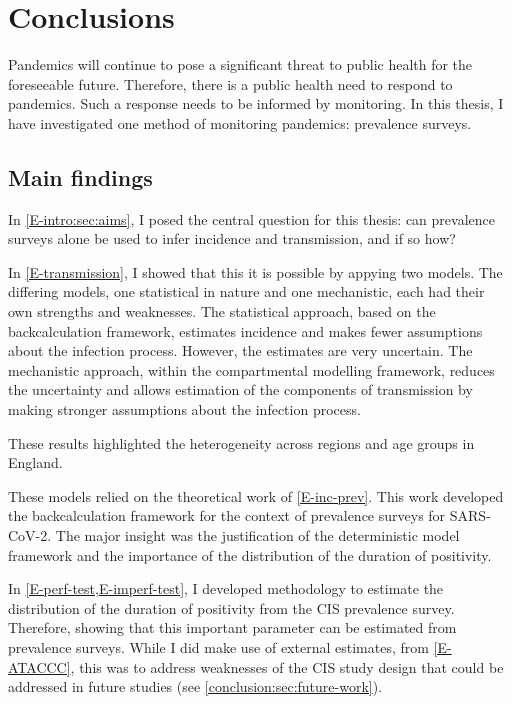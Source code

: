 \documentclass[thesis.tex]{subfiles}
\begin{document}
\ifSubfilesClassLoaded{
    \setcounter{chapter}{7}
}

\chapter{Conclusions} \label{conclusion}

Pandemics will continue to pose a significant threat to public health for the foreseeable future.
Therefore, there is a public health need to respond to pandemics.
Such a response needs to be informed by monitoring.
In this thesis, I have investigated one method of monitoring pandemics: prevalence surveys.

\section{Main findings}

In \cref{E-intro:sec:aims}, I posed the central question for this thesis: can prevalence surveys alone be used to infer incidence and transmission, and if so how?

In \cref{E-transmission}, I showed that this it is possible by appying two models.
The differing models, one statistical in nature and one mechanistic, each had their own strengths and weaknesses.
The statistical approach, based on the backcalculation framework, estimates incidence and makes fewer assumptions about the infection process.
However, the estimates are very uncertain.
The mechanistic approach, within the compartmental modelling framework, reduces the uncertainty and allows estimation of the components of transmission by making stronger assumptions about the infection process.

These results highlighted the heterogeneity across regions and age groups in England.

These models relied on the theoretical work of \cref{E-inc-prev}.
This work developed the backcalculation framework for the context of prevalence surveys for SARS-CoV-2.
The major insight was the justification of the deterministic model framework and the importance of the distribution of the duration of positivity.

In \cref{E-perf-test,E-imperf-test}, I developed methodology to estimate the distribution of the duration of positivity from the CIS prevalence survey.
Therefore, showing that this important parameter can be estimated from prevalence surveys.
While I did make use of external estimates, from \cref{E-ATACCC}, this was to address weaknesses of the CIS study design that could be addressed in future studies (see \cref{conclusion:sec:future-work}).
\end{document}
